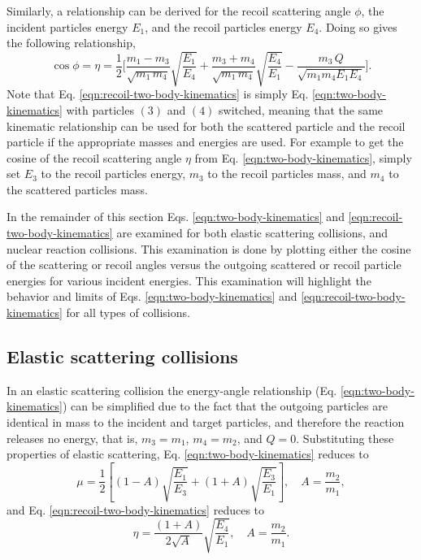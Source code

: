 \documentclass[../main.tex]{subfiles}
\begin{document}
Similarly, a relationship can be derived for the recoil scattering angle $\phi$, the incident particles energy $E_1$, and the recoil particles energy $E_4$. Doing so gives the following relationship,
\begin{equation} \label{eqn:recoil-two-body-kinematics}
  \cos \phi = \eta = \dfrac{1}{2} \Bigg[\frac{m_{1} - m_{3}}{\sqrt{m_{1} \, m_{4}}}\sqrt{\dfrac{E_{1}}{E_{4}}} + \frac{m_{3} + m_{4}}{\sqrt{m_{1} \, m_{4}}}\sqrt{\dfrac{E_{4}}{E_{1}}} - \dfrac{m_{3} \, Q}{\sqrt{m_{1} m_{4} E_{1} E_{4}}}\Bigg].
\end{equation}
Note that Eq. \eqref{eqn:recoil-two-body-kinematics} is simply Eq. \eqref{eqn:two-body-kinematics} with particles $(3)$ and $(4)$ switched, meaning that the same kinematic relationship can be used for both the scattered particle and the recoil particle if the appropriate masses and energies are used. For example to get the cosine of the recoil scattering angle $\eta$ from Eq. \eqref{eqn:two-body-kinematics}, simply set $E_3$ to the recoil particles energy, $m_3$ to the recoil particles mass, and $m_4$ to the scattered particles mass.

In the remainder of this section Eqs. \eqref{eqn:two-body-kinematics} and \eqref{eqn:recoil-two-body-kinematics} are examined for both elastic scattering collisions, and nuclear reaction collisions. This examination is done by plotting either the cosine of the scattering or recoil angles versus the outgoing scattered or recoil particle energies for various incident energies. This examination will highlight the behavior and limits of Eqs. \eqref{eqn:two-body-kinematics} and \eqref{eqn:recoil-two-body-kinematics} for all types of collisions.

\subsection{Elastic scattering collisions}
In an elastic scattering collision the energy-angle relationship (Eq. \ref{eqn:two-body-kinematics}) can be simplified due to the fact that the outgoing particles are identical in mass to the incident and target particles, and therefore the reaction releases no energy, that is, $m_{3} = m_{1}$, $m_{4} = m_{2}$, and $Q = 0$. Substituting these properties of elastic scattering, Eq. \eqref{eqn:two-body-kinematics} reduces to 
\begin{equation} \label{eqn:elastic-scattering-angle-energy-rel}
  \mu = \dfrac{1}{2} \left[\left(1 - A\right)\sqrt{\dfrac{E_{1}}{E_{3}}} + \left(1 + A\right)\sqrt{\dfrac{E_{3}}{E_{1}}}\right], \quad A = \dfrac{m_{2}}{m_{1}},
\end{equation}
and Eq. \eqref{eqn:recoil-two-body-kinematics} reduces to 
\begin{equation} \label{eqn:elastic-recoil-angle-energy-rel}
  \eta = \dfrac{(1+A)}{2 \sqrt{A}} \sqrt{\dfrac{E_4}{E_1}}, \quad A = \dfrac{m_{2}}{m_{1}}.
\end{equation}
\end{document}
